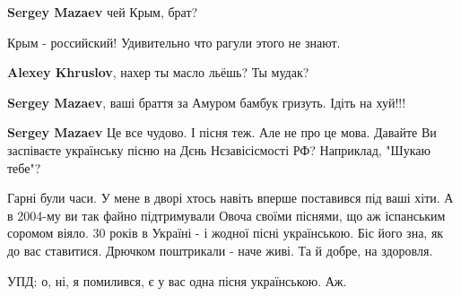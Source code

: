 \begin{itemize}
\textbf{Sergey Mazaev} чей Крым, брат?

 

Крым - российский! Удивительно что рагули этого не знают.

\begin{itemize}
 
\textbf{Alexey Khruslov}, нахер ты масло льёшь?
Ты мудак?
\end{itemize}

 
\textbf{Sergey Mazaev}, ваші браття за Амуром бамбук гризуть. Ідіть на хуй!!!

 
\textbf{Sergey Mazaev} Це все чудово. І пісня теж. Але не про це мова. Давайте Ви заспіваєте українську пісню на Дєнь Нєзавісісмості РФ? Наприклад, "Шукаю тебе"?

 

Гарні були часи. У мене в дворі хтось навіть вперше поставився під ваші хіти. А
в 2004-му ви так файно підтримували Овоча своїми піснями, що аж іспанським
соромом віяло. 30 років в Україні - і жодної пісні українською. Біс його зна,
як до вас ставитися. Дрючком поштрикали - наче живі. Та й добре, на здоровля.

УПД: о, ні, я помилився, є у вас одна пісня українською. Аж.

\end{itemize}

